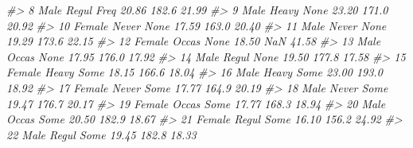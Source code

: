 \documentclass[
]{book}
\newenvironment{Shaded}{\begin{snugshade}}{\end{snugshade}}
\newcommand{\CommentTok}[1]{\textcolor[rgb]{0.56,0.35,0.01}{\textit{#1}}}
\begin{document}
\begin{Shaded}
\begin{Highlighting}[]
\CommentTok{\#\textgreater{} 8    Male Regul Freq  20.86  182.6 21.99}
\CommentTok{\#\textgreater{} 9    Male Heavy None  23.20  171.0 20.92}
\CommentTok{\#\textgreater{} 10 Female Never None  17.59  163.0 20.40}
\CommentTok{\#\textgreater{} 11   Male Never None  19.29  173.6 22.15}
\CommentTok{\#\textgreater{} 12 Female Occas None  18.50    NaN 41.58}
\CommentTok{\#\textgreater{} 13   Male Occas None  17.95  176.0 17.92}
\CommentTok{\#\textgreater{} 14   Male Regul None  19.50  177.8 17.58}
\CommentTok{\#\textgreater{} 15 Female Heavy Some  18.15  166.6 18.04}
\CommentTok{\#\textgreater{} 16   Male Heavy Some  23.00  193.0 18.92}
\CommentTok{\#\textgreater{} 17 Female Never Some  17.77  164.9 20.19}
\CommentTok{\#\textgreater{} 18   Male Never Some  19.47  176.7 20.17}
\CommentTok{\#\textgreater{} 19 Female Occas Some  17.77  168.3 18.94}
\CommentTok{\#\textgreater{} 20   Male Occas Some  20.50  182.9 18.67}
\CommentTok{\#\textgreater{} 21 Female Regul Some  16.10  156.2 24.92}
\CommentTok{\#\textgreater{} 22   Male Regul Some  19.45  182.8 18.33}


\end{Highlighting}
\end{Shaded}
\end{document}
